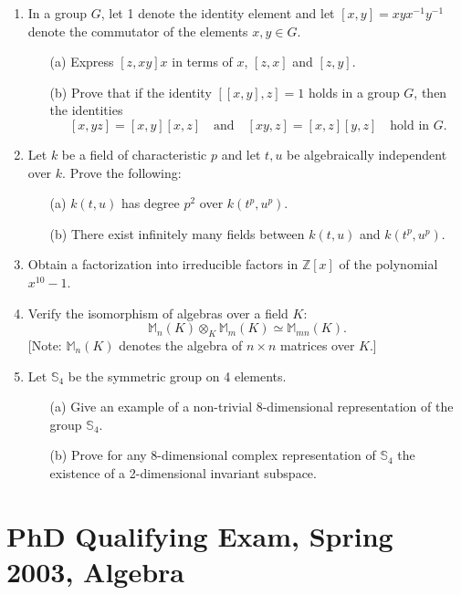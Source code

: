 \documentclass{article}
\begin{document}
\begin{enumerate}
    \item In a group \(G\), let 1 denote the identity element and let \([x, y] = xyx^{-1}y^{-1}\) denote the commutator of the elements \(x, y \in G\).
    \begin{itemize}
        \item[(a)] Express \([z, xy]x\) in terms of \(x\), \([z, x]\) and \([z, y]\).
        \item[(b)] Prove that if the identity \([[x, y], z] = 1\) holds in a group \(G\), then the identities
        \[[x, yz] = [x, y][x, z] \quad \text{and} \quad [xy, z] = [x, z][y, z] \quad \text{hold in } G.\]
    \end{itemize}

    \item Let \(k\) be a field of characteristic \(p\) and let \(t, u\) be algebraically independent over \(k\). Prove the following:
    \begin{itemize}
        \item[(a)] \(k(t, u)\) has degree \(p^2\) over \(k(t^p, u^p)\).
        \item[(b)] There exist infinitely many fields between \(k(t, u)\) and \(k(t^p, u^p)\).
    \end{itemize}

    \item Obtain a factorization into irreducible factors in \(\mathbb{Z}[x]\) of the polynomial \(x^{10} - 1\).

    \item Verify the isomorphism of algebras over a field \(K\):
    \[\mathbb{M}_n(K) \otimes_K \mathbb{M}_{m}(K) \simeq \mathbb{M}_{mn}(K).\]
    [Note: \(\mathbb{M}_n(K)\) denotes the algebra of \(n \times n\) matrices over \(K\).]

    \item Let \(\mathbb{S}_4\) be the symmetric group on 4 elements.
    \begin{itemize}
        \item[(a)] Give an example of a non-trivial 8-dimensional representation of the group \(\mathbb{S}_4\).
        \item[(b)] Prove for any 8-dimensional complex representation of \(\mathbb{S}_4\) the existence of a 2-dimensional invariant subspace.
    \end{itemize}
\end{enumerate}

\section*{PhD Qualifying Exam, Spring 2003, Algebra}
\end{document}
